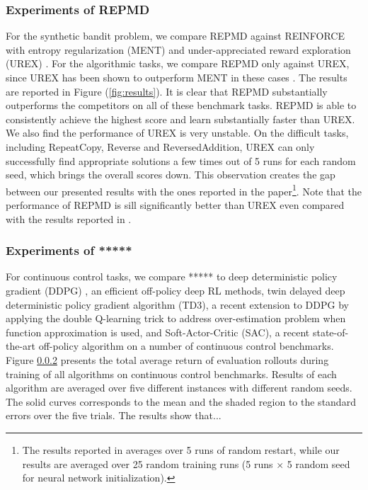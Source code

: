\subsubsection{Experiments of REPMD}
For the synthetic bandit problem, we compare REPMD against REINFORCE with entropy regularization (MENT) \citep{williams1992simple} and under-appreciated reward exploration (UREX) \citep{nachum2017improving}. For the algorithmic tasks, we compare REPMD only against UREX, since UREX has been shown to outperform MENT in these cases \citep{nachum2017improving}. The results are reported in Figure (\ref{fig:results}). It is clear that REPMD substantially outperforms the competitors on all of these benchmark tasks. REPMD is able to consistently achieve the highest score and learn substantially faster than UREX. We also find the performance of UREX is very unstable. On the difficult tasks, including RepeatCopy, Reverse and ReversedAddition, UREX can only successfully find appropriate solutions a few times out of 5 runs for each random seed, which brings the overall scores down. This observation creates the gap between our presented results with the ones reported in the paper\footnote{The results reported in \citet{nachum2017improving} averages over 5 runs of random restart, while our results are averaged over 25 random training runs (5 runs $\times$ 5 random seed for neural network initialization). }. Note that the performance of REPMD is sill significantly better than UREX even compared with the results reported in \citet{nachum2017improving}. 

\subsubsection{Experiments of *****}

For continuous control tasks, we compare ***** to deep deterministic policy gradient (DDPG) \citep{}, an efficient off-policy deep
RL methods, twin delayed deep deterministic policy gradient algorithm (TD3), a recent extension to DDPG by applying the double Q-learning trick to address over-estimation problem when function approximation is used, and Soft-Actor-Critic (SAC), a recent state-of-the-art off-policy algorithm on a number of continuous control benchmarks. Figure \ref{} presents the total average return of evaluation rollouts during training of all algorithms on continuous control benchmarks. Results of each algorithm are averaged over five different instances with different random seeds. The solid curves corresponds to the mean and the shaded region to the standard errors over the five trials. The results show that...

